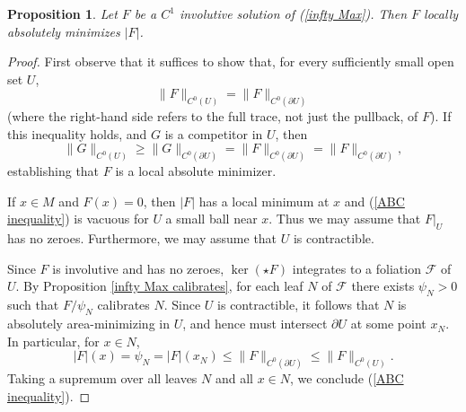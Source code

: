 \documentclass[reqno,11pt]{amsart}
\DeclareMathOperator{\id}{id}
\newtheorem{proposition}[theorem]{Proposition}
\theoremstyle{definition}
\numberwithin{equation}{section}
\begin{document}
\begin{proposition}\label{tight and integrable implies infinity maxwell}
Let $F$ be a $C^1$ involutive solution of (\ref{infty Max}).
Then $F$ locally absolutely minimizes $|F|$.
\end{proposition}
\begin{proof}
First observe that it suffices to show that, for every sufficiently small open set $U$,
\begin{equation}\label{ABC inequality}
\|F\|_{C^0(U)} = \|F\|_{C^0(\partial U)}
\end{equation}
(where the right-hand side refers to the full trace, not just the pullback, of $F$).
If this inequality holds, and $G$ is a competitor in $U$, then
$$\|G\|_{C^0(U)} \geq \|G\|_{C^0(\partial U)} = \|F\|_{C^0(\partial U)} = \|F\|_{C^0(\partial U)},$$
establishing that $F$ is a local absolute minimizer.

If $x \in M$ and $F(x) = 0$, then $|F|$ has a local minimum at $x$ and (\ref{ABC inequality}) is vacuous for $U$ a small ball near $x$.
Thus we may assume that $F|_U$ has no zeroes.
Furthermore, we may assume that $U$ is contractible.

Since $F$ is involutive and has no zeroes, $\ker(\star F)$ integrates to a foliation $\mathscr F$ of $U$.
By Proposition \ref{infty Max calibrates}, for each leaf $N$ of $\mathscr F$ there exists $\psi_N > 0$ such that $F/\psi_N$ calibrates $N$.
Since $U$ is contractible, it follows that $N$ is absolutely area-minimizing in $U$, and hence must intersect $\partial U$ at some point $x_N$.
In particular, for $x \in N$,
$$|F|(x) = \psi_N = |F|(x_N) \leq \|F\|_{C^0(\partial U)} \leq \|F\|_{C^0(U)}.$$
Taking a supremum over all leaves $N$ and all $x \in N$, we conclude (\ref{ABC inequality}).
\end{proof}


\end{document}
